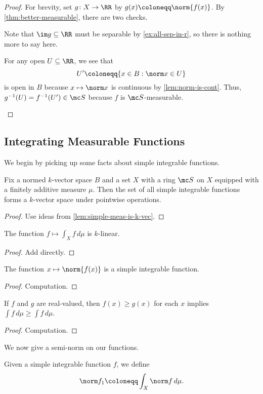 \documentclass[../notes.tex]{subfiles}
\begin{document}
\begin{proof}
	For brevity, set $g\colon X\to\RR$ by $g(x)\coloneqq\norm{f(x)}$. By \autoref{thm:better-measurable}, there are two checks.
	\begin{listroman}
		\item Note that $\im g\subseteq\RR$ must be separable by \autoref{ex:all-sep-in-r}, so there is nothing more to say here.
		\item For any open $U\subseteq\RR$, we see that
		\[U'\coloneqq\{x\in B:\norm x\in U\}\]
		is open in $B$ because $x\mapsto\norm x$ is continuous by \autoref{lem:norm-is-cont}. Thus, $g^{-1}(U)=f^{-1}(U')\in\mc S$ because $f$ is $\mc S$-measurable.
		\qedhere
	\end{listroman}
\end{proof}

\subsection{Integrating Measurable Functions}
We begin by picking up some facts about simple integrable functions.
\begin{lemma}
	Fix a normed $k$-vector space $B$ and a set $X$ with a ring $\mc S$ on $X$ equipped with a finitely additive measure $\mu$. Then the set of all simple integrable functions forms a $k$-vector space under pointwise operations.
\end{lemma}
\begin{proof}
	Use ideas from \autoref{lem:simple-meas-is-k-vec}.
\end{proof}
\begin{lemma}
	The function $f\mapsto\int_Xf\,d\mu$ is $k$-linear.
\end{lemma}
\begin{proof}
	Add directly.
\end{proof}
\begin{lemma}
	The function $x\mapsto\norm{f(x)}$ is a simple integrable function.
\end{lemma}
\begin{proof}
	Computation.
\end{proof}
\begin{lemma}
	If $f$ and $g$ are real-valued, then $f(x)\ge g(x)$ for each $x$ implies $\int f\,d\mu\ge\int f\,d\mu$.
\end{lemma}
\begin{proof}
	Computation.
\end{proof}
We now give a semi-norm on our functions.
\begin{definition}
	Given a simple integrable function $f$, we define
	\[\norm f_1\coloneqq\int_X\norm f\,d\mu.\]
\end{definition}
\end{document}
